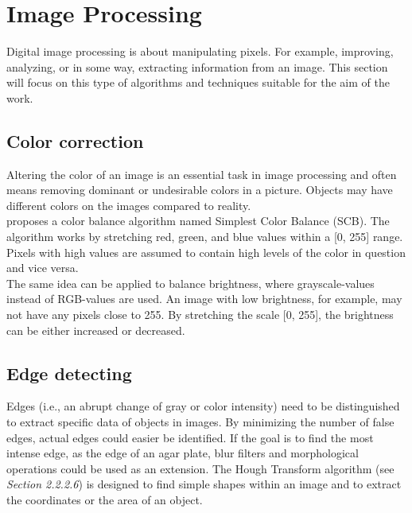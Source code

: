\section{Image Processing}

\noindent Digital image processing is about manipulating pixels. For example, improving, analyzing, or in some way, extracting information from an image. This section will focus on this type of algorithms and techniques suitable for the aim of the work.

\subsection{Color correction}
Altering the color of an image is an essential task in image processing and often means removing dominant or undesirable colors in a picture. Objects may have different colors on the images compared to reality. \\

\noindent \cite{Limare} proposes a color balance algorithm named Simplest Color Balance (SCB). The algorithm works by stretching red, green, and blue values within a [0, 255] range. Pixels with high values are assumed to contain high levels of the color in question and vice versa. \\

\noindent The same idea can be applied to balance brightness, where grayscale-values instead of RGB-values are used. An image with low brightness, for example, may not have any pixels close to 255. By stretching the scale [0, 255], the brightness can be either increased or decreased. 

\subsection{Edge detecting}
\noindent Edges (i.e., an abrupt change of gray or color intensity) need to be distinguished to extract specific data of objects in images. By minimizing the number of false edges, actual edges could easier be identified. If the goal is to find the most intense edge, as the edge of an agar plate, blur filters and morphological operations could be used as an extension. The Hough Transform algorithm (see \textit{Section 2.2.2.6}) is designed to find simple shapes within an image and to extract the coordinates or the area of an object.



